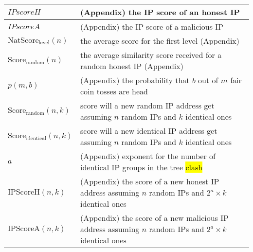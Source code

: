 \begin{table*}
\begin{center}
\begin{tabular}{ | l | p{16cm} |}
        $\textit{IPscoreH}$ & (Appendix) the IP score of an honest IP \\ \hline
        $\textit{IPscoreA}$ & (Appendix) the IP score of a malicious IP \\ \hline
        $\text{NatScore}_{\text{level}}(n)$ & the average score for the first level (Appendix) \\ \hline
        $\text{Score}_{\text{random}}(n)$ & the average similarity score received for a random honest IP (Appendix) \\ \hline
        $p(m,b) $ & (Appendix) the probability that $b$ out of $m$ fair coin tosses are head \\ \hline
        $\text{Score}_{\text{random}}(n,k)$ & score will a new random IP address get assuming $n$ random IPs and $k$ identical ones \\ \hline
        $\text{Score}_{\text{identical}}(n,k)$ & score will a new identical IP address get assuming $n$ random IPs and $k$ identical ones \\ \hline
        $a$ & (Appendix) exponent for the number of identical IP groups in the tree \hl{clash}\\ \hline
        $\text{IPScoreH}(n,k)$ & (Appendix) the score of a new honest IP address assuming $n$ random IPs and $2^a \times k$ identical ones \\ \hline
        $\text{IPScoreA}(n,k)$ & (Appendix) the score of a new malicious IP address assuming $n$ random IPs and $2^a \times k$ identical ones \\ \hline
      \hline
    \end{tabular}
  \end{center}
\end{table*}



